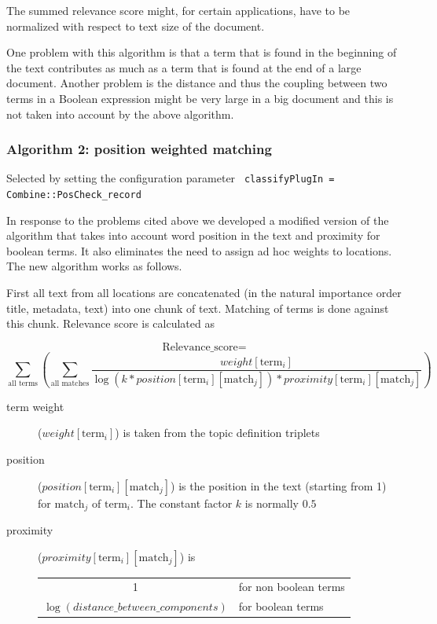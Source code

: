 The summed relevance score might, for certain applications, have to be
normalized with respect to text size of the document.

One problem with this algorithm is that a term that is found in the
beginning of the text contributes as much as a term that is found at
the end of a large document. Another problem is the distance and thus
the coupling between two terms in a Boolean expression might be very
large in a big document and this is not taken into account by the
above algorithm.

\subsubsection{Algorithm 2: position weighted matching}
\label{pos}
Selected by setting the configuration parameter {\tt 
classifyPlugIn = Combine::PosCheck\_record}

In response to the problems cited above we developed a modified
version of the algorithm that takes into account word position in the
text and proximity for boolean terms. It also eliminates the need to
assign ad hoc weights to locations. The new algorithm works as
follows.

First all text from all locations are concatenated (in the natural importance order
title, metadata, text) into one chunk of text. Matching of terms is done
against this chunk. Relevance score is calculated as

\vbox{
\[ \mbox{Relevance\_score} = \]
\[ \sum_{\mbox{all terms}} \left( \sum_{\mbox{all matches}}
\frac{weight[\mbox{term}_{i}]}{\log(k * position[\mbox{term}_{i}][\mbox{match}_{j}]) * proximity[\mbox{term}_{i}][\mbox{match}_{j}]} \right) \]}

\begin{description}
\item[term weight] ($weight[\mbox{term}_{i}]$) is taken from the topic
 definition triplets

\item[position] ($position[\mbox{term}_{i}][\mbox{match}_{j}]$) is the position
in the text (starting from 1) for $\mbox{match}_{j}$ of $\mbox{term}_{i}$.
The constant factor $k$ is normally $0.5$

\item[proximity] ($proximity[\mbox{term}_{i}][\mbox{match}_{j}]$) is

\begin{tabular}{cl}
 1 & for non boolean terms\\
 $\log(distance\_between\_components)$ & for boolean terms\\
\end{tabular}
\end{description}

